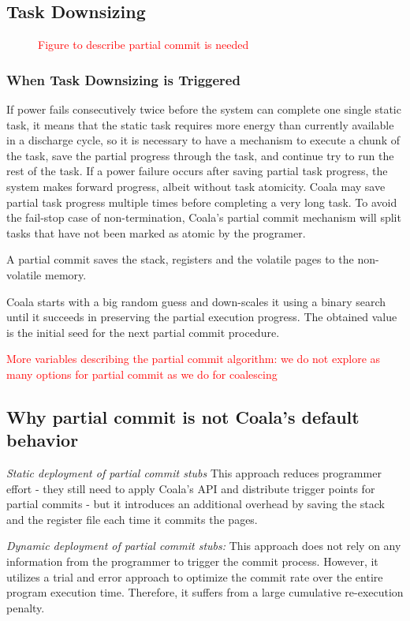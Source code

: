 \subsection{Task Downsizing} %

\begin{figure}
	\caption{\textcolor{red}{Figure to describe partial commit is needed}}
\end{figure}

\subsubsection{When Task Downsizing is Triggered}

If power fails consecutively twice before the system can complete one single static task, it means that the static task requires more energy than currently available in a discharge cycle, so it is necessary to have a mechanism to execute a chunk of the task, save the partial progress through the task, and continue try to run the rest of the task.  If a power failure occurs after saving partial task progress, the system makes forward progress, albeit without task atomicity. Coala may save partial task progress multiple times before completing a very long task.  To avoid the fail-stop case of non-termination, Coala's partial commit mechanism will split tasks that have not been marked as atomic by the programer.

A partial commit saves the stack, registers and the volatile pages to the non-volatile memory.

Coala starts with a big random guess and down-scales it using a binary search until it succeeds in preserving the partial execution progress. The obtained value is the initial seed for the next partial commit procedure.

\textcolor{red}{More variables describing the partial commit algorithm: we do not explore as many options for partial commit as we do for coalescing}

\subsection{Why partial commit is not Coala's default behavior}

\emph{Static deployment of partial commit stubs} This approach reduces programmer effort - they still need to apply Coala's API and distribute trigger points for partial commits - but it introduces an additional overhead by saving the stack and the register file each time it commits the pages. 

\emph{Dynamic deployment of partial commit stubs:} This approach does not rely on any information from the programmer to trigger the commit process. However, it utilizes a trial and error approach to optimize the commit rate over the entire program execution time. Therefore, it suffers from a large cumulative re-execution penalty.  